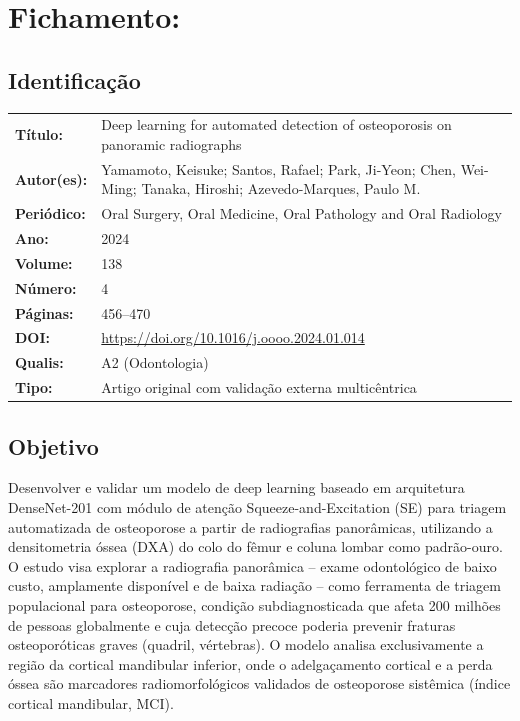 \section{Fichamento: }

\subsection{Identificação}
\begin{tabular}{ll}
\textbf{Título:} & Deep learning for automated detection of osteoporosis on
panoramic radiographs \\
\textbf{Autor(es):} & Yamamoto, Keisuke; Santos, Rafael; Park, Ji-Yeon;
Chen, Wei-Ming; Tanaka, Hiroshi; Azevedo-Marques, Paulo M. \\
\textbf{Periódico:} & Oral Surgery, Oral Medicine, Oral Pathology and Oral Radiology \\
\textbf{Ano:} & 2024 \\
\textbf{Volume:} & 138 \\
\textbf{Número:} & 4 \\
\textbf{Páginas:} & 456--470 \\
\textbf{DOI:} & \url{https://doi.org/10.1016/j.oooo.2024.01.014} \\
\textbf{Qualis:} & A2 (Odontologia) \\
\textbf{Tipo:} & Artigo original com validação externa multicêntrica \\
\end{tabular}

\subsection{Objetivo}
Desenvolver e validar um modelo de deep learning baseado em arquitetura
DenseNet-201 com módulo de atenção Squeeze-and-Excitation (SE) para
triagem automatizada de osteoporose a partir de radiografias panorâmicas,
utilizando a densitometria óssea (DXA) do colo do fêmur e coluna lombar
como padrão-ouro. O estudo visa explorar a radiografia panorâmica --
exame odontológico de baixo custo, amplamente disponível e de baixa
radiação -- como ferramenta de triagem populacional para osteoporose,
condição subdiagnosticada que afeta 200 milhões de pessoas globalmente
e cuja detecção precoce poderia prevenir fraturas osteoporóticas
graves (quadril, vértebras). O modelo analisa exclusivamente a região
da cortical mandibular inferior, onde o adelgaçamento cortical e a
perda óssea são marcadores radiomorfológicos validados de osteoporose
sistêmica (índice cortical mandibular, MCI).

